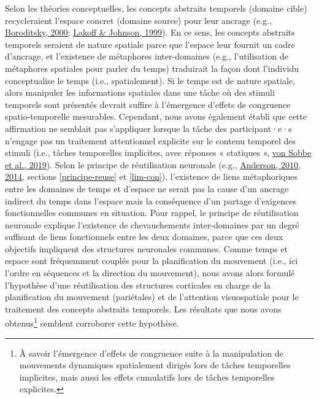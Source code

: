 \documentclass[
  a4paper,12pt,twoside,onecolumn,openright,final,oldfontcommands]{memoir}
\begin{document}
Selon les théories conceptuelles, les concepts abstraits temporels (domaine cible) recycleraient l'espace concret (domaine source) pour leur ancrage (e.g., \protect\hyperlink{ref-boroditsky_metaphoric_2000}{Boroditsky, 2000}; \protect\hyperlink{ref-lakoff_philosophy_1999}{Lakoff \& Johnson, 1999}). En ce sens, les concepts abstraits temporels seraient de nature spatiale parce que l'espace leur fournit un cadre d'ancrage, et l'existence de métaphores inter-domaines (e.g., l'utilisation de métaphores spatiales pour parler du temps) traduirait la façon dont l'individu conceptualise le temps (i.e., spatialement). Si le temps est de nature spatiale, alors manipuler les informations spatiales dans une tâche où des stimuli temporels sont présentés devrait suffire à l'émergence d'effets de congruence spatio-temporelle mesurables. Cependant, nous avons également établi que cette affirmation ne semblait pas s'appliquer lorsque la tâche des participant·e·s n'engage pas un traitement attentionnel explicite sur le contenu temporel des stimuli (i.e., tâches temporelles implicites, avec réponses « statiques », \protect\hyperlink{ref-von_sobbe_space-time_2019}{von Sobbe et al., 2019}). Selon le principe de réutilisation neuronale (e.g., \protect\hyperlink{ref-anderson_neural_2010}{Anderson, 2010}, \protect\hyperlink{ref-anderson_after_2014}{2014}, sections \ref{principe-reuse} et \ref{lim-con}), l'existence de liens métaphoriques entre les domaines de temps et d'espace ne serait pas la cause d'un ancrage indirect du temps dans l'espace mais la conséquence d'un partage d'exigences fonctionnelles communes en situation. Pour rappel, le principe de réutilisation neuronale explique l'existence de chevauchements inter-domaines par un degré suffisant de liens fonctionnels entre les deux domaines, parce que ces deux objectifs impliquent des structures neuronales communes. Comme temps et espace sont fréquemment couplés pour la planification du mouvement (i.e., ici l'ordre en séquences et la direction du mouvement), nous avons alors formulé l'hypothèse d'une réutilisation des structures corticales en charge de la planification du mouvement (pariétales) et de l'attention visuospatiale pour le traitement des concepts abstraits temporels. Les résultats que nous avons obtenus\footnote{À savoir l'émergence d'effets de congruence suite à la manipulation de mouvements dynamiques spatialement dirigés lors de tâches temporelles implicites, mais aussi les effets cumulatifs lors de tâches temporelles explicites.} semblent corroborer cette hypothèse.
\end{document}
